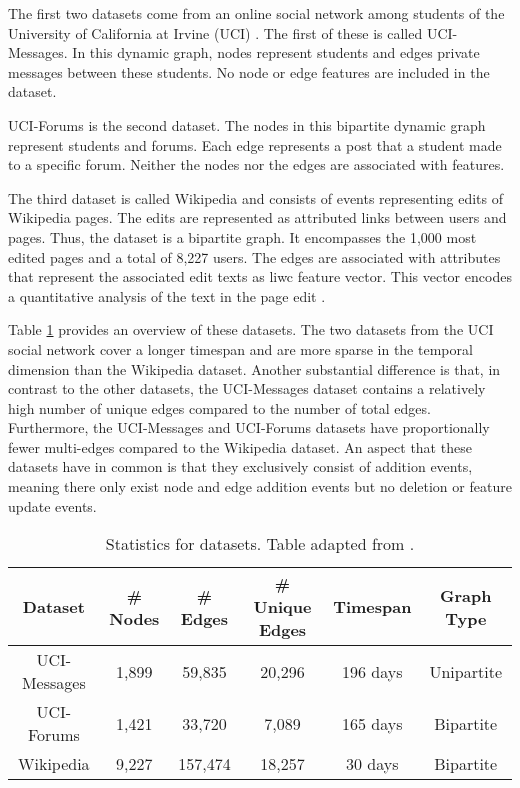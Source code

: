 The first two datasets come from an online social network among students of the University of California at Irvine (UCI) \cite{kunegis_konect_2013}. The first of these is called UCI-Messages. In this dynamic graph, nodes represent students and edges private messages between these students. No node or edge features are included in the dataset. 

UCI-Forums is the second dataset. The nodes in this bipartite dynamic graph represent students and forums. Each edge represents a post that a student made to a specific forum. Neither the nodes nor the edges are associated with features.

The third dataset is called Wikipedia \cite{kumar_predicting_2019} and consists of events representing edits of Wikipedia pages. The edits are represented as attributed links between users and pages. Thus, the dataset is a bipartite graph. It encompasses the 1,000 most edited pages and a total of 8,227 users. The edges are associated with attributes that represent the associated edit texts as \gls{liwc} \cite{pennebaker_linguistic_2001} feature vector. This vector encodes a quantitative analysis of the text in the page edit \cite{pennebaker_linguistic_2001}.

Table \ref{t_Datasets} provides an overview of these datasets. The two datasets from the UCI social network cover a longer timespan and are more sparse in the temporal dimension than the Wikipedia dataset. Another substantial difference is that, in contrast to the other datasets, the UCI-Messages dataset contains a relatively high number of unique edges compared to the number of total edges. 
Furthermore, the UCI-Messages and UCI-Forums datasets have proportionally fewer multi-edges compared to the Wikipedia dataset. An aspect that these datasets have in common is that they exclusively consist of addition events, meaning there only exist node and edge addition events but no deletion or feature update events.

\begin{table}[ht]
    \centering
    \begin{tabular}{cccccc}
        \hline
         Dataset&  \# Nodes&  \# Edges&  \# Unique Edges& Timespan & Graph Type\\
         \hline
         UCI-Messages \cite{kunegis_konect_2013} & 1,899 & 59,835 & 20,296 &196 days & Unipartite\\
        UCI-Forums \cite{kunegis_konect_2013}& 1,421& 33,720& 7,089&165 days& Bipartite\\
        Wikipedia \cite{kumar_predicting_2019}& 9,227& 157,474& 18,257&30 days& Bipartite\\
        \hline
    \end{tabular}
    \caption{Statistics for datasets. Table adapted from \cite{poursafaei_towards_2022}.}
    \label{t_Datasets}
\end{table}


